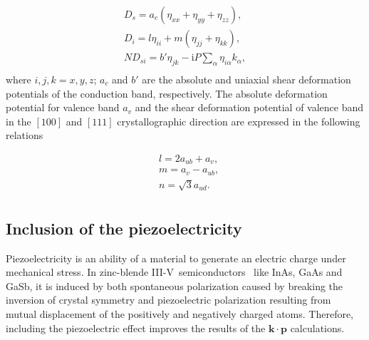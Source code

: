 \begin{eqnarray*}
	D_s=a_c(\eta_{xx}+\eta_{yy}+\eta_{zz}),\nonumber\\
	D_i=l\eta_{ii}+m(\eta_{jj}+\eta_{kk}),\nonumber\\
	ND_{si}=b'\eta_{jk}-\mathrm{i}P\sum_\alpha\eta_{i\alpha}k_\alpha,\nonumber\\
\end{eqnarray*}
where $i,j,k=x,y,z$; $a_c$ and $b'$ are the absolute and uniaxial shear deformation potentials of the conduction band, respectively. The absolute deformation potential for valence band $a_v$ and the shear deformation potential of valence band in the $[100]$ and $[111]$ crystallographic direction are expressed in the following relations

\begin{eqnarray*}
	&l=2a_{ub}+a_v,\nonumber\\
	&m=a_v-a_{ub},\nonumber\\
	&n=\sqrt{3}a_{ud}.\nonumber\\
\end{eqnarray*}





\subsection{Inclusion of the piezoelectricity}
\label{subPiezo}



Piezoelectricity is an ability of a material to generate an electric charge under mechanical stress. In zinc-blende {III-V}~semiconductors~\citep{Hubner,Zeller,Gironcoli,KingSmith} like InAs, GaAs and GaSb, it is induced by both spontaneous polarization caused by breaking the inversion of crystal symmetry and piezoelectric polarization resulting from mutual displacement of the positively and negatively charged atoms. Therefore, including the piezoelectric effect improves the results of the $\mathbf{k}\cdot\mathbf{p}$ calculations.

